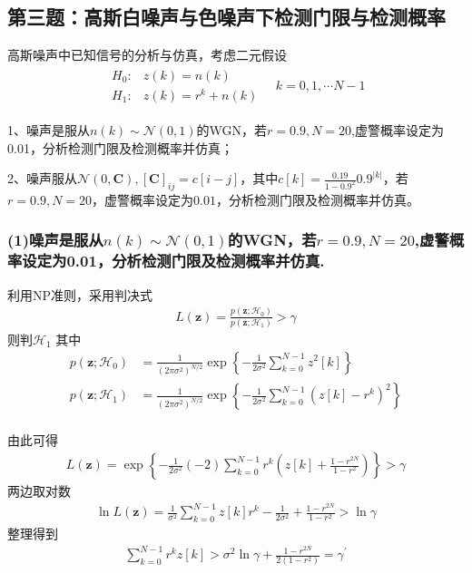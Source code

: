 \documentclass[fontset=windows]{article}
\numberwithin{figure}{section}
\begin{document}
\subsection{第三题：高斯白噪声与色噪声下检测门限与检测概率}

高斯噪声中已知信号的分析与仿真，考虑二元假设
\begin{align*}
	\begin{matrix}
		H_0: & z(k)=n(k)     \\
		H_1: & z(k)=r^k+n(k)
	\end{matrix}\quad k=0,1,\cdots N-1
\end{align*}

1、噪声是服从\(n(k)\sim \mathcal{N}(0,1)\)的WGN，若\(r=0.9,N=20\),虚警概率设定为0.01，分析检测门限及检测概率并仿真；

2、噪声服从\(\mathcal{N}(0,\mathbf{C}),[\mathbf{C}]_{ij}=c[i-j]\)，其中\(c[k]=\frac{0.19}{1-0.9^2}0.9^{|k|}\)，若\(r=0.9,N=20\)，虚警概率设定为\(0.01\)，分析检测门限及检测概率并仿真。

\subsubsection*{(1)噪声是服从\(n(k)\sim \mathcal{N}(0,1)\)的WGN，若\(r=0.9,N=20\),虚警概率设定为0.01，分析检测门限及检测概率并仿真.}

利用NP准则，采用判决式
\begin{align*}
	L(\mathbf{z})=\frac{p(\mathbf{z};\mathcal{H}_0)}{p(\mathbf{z};\mathcal{H}_1)}>\gamma
\end{align*}
则判\(\mathcal{H}_1\)
其中
\begin{align*}
	p(\mathbf{z};\mathcal{H}_0)
	 & =\frac{1}{(2\pi\sigma^2)^{N/2}}\exp\left\{-\frac{1}{2\sigma^2}\sum_{k=0}^{N-1}z^2[k]\right\}       \\
	p(\mathbf{z};\mathcal{H}_1)
	 & =\frac{1}{(2\pi\sigma^2)^{N/2}}\exp\left\{-\frac{1}{2\sigma^2}\sum_{k=0}^{N-1}(z[k]-r^k)^2\right\} \\
\end{align*}

由此可得
\begin{align*}
	L(\mathbf{z})=\exp\left\{-\frac{1}{2\sigma^2}(-2)\sum_{k=0}^{N-1}r^k(z[k]+\frac{1-r^{2N}}{1-r^2})\right\}>\gamma
\end{align*}
两边取对数
\begin{align*}
	\ln L(\mathbf{z})=\frac{1}{\sigma^2}\sum_{k=0}^{N-1}z[k]r^k-\frac{1}{2\sigma^2}+\frac{1-r^{2N}}{1-r^2}>\ln\gamma
\end{align*}
整理得到
\begin{align*}
	\sum_{k=0}^{N-1}r^kz[k]>\sigma^2 \ln \gamma+\frac{1-r^{2N}}{2(1-r^2)}=\gamma^{\prime}
\end{align*}
\end{document}
